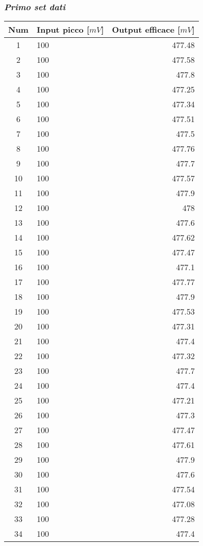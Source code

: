 \documentclass[a4paper]{article}
\begin{document}
	\subsubsection*{\textit{Primo set dati}}	
	\begin{center}
		\label{set1}
		\begin{tabular}{|c|lr|}
			\toprule
			Num	&	Input picco [$mV$]	&	Output efficace [$mV$] 	\\
			\midrule
			1	&	100	&	477.48	\\
			2	&	100	&	477.58	\\
			3	&	100	&	477.8	\\
			4	&	100	&	477.25	\\
			5	&	100	&	477.34	\\
			6	&	100	&	477.51	\\
			7	&	100	&	477.5	\\
			8	&	100	&	477.76	\\
			9	&	100	&	477.7	\\
			10	&	100	&	477.57	\\
			11	&	100	&	477.9	\\
			12	&	100	&	478	\\
			13	&	100	&	477.6	\\
			14	&	100	&	477.62	\\
			15	&	100	&	477.47	\\
			16	&	100	&	477.1	\\
			17	&	100	&	477.77	\\
			18	&	100	&	477.9	\\
			19	&	100	&	477.53	\\
			20	&	100	&	477.31	\\
			21	&	100	&	477.4	\\
			22	&	100	&	477.32	\\
			23	&	100	&	477.7	\\
			24	&	100	&	477.4	\\
			25	&	100	&	477.21	\\
			26	&	100	&	477.3	\\
			27	&	100	&	477.47	\\
			28	&	100	&	477.61	\\
			29	&	100	&	477.9	\\
			30	&	100	&	477.6	\\
			31	&	100	&	477.54	\\
			32	&	100	&	477.08	\\
			33	&	100	&	477.28	\\
			34	&	100	&	477.4	\\

\end{tabular}
\end{center}
\end{document}

